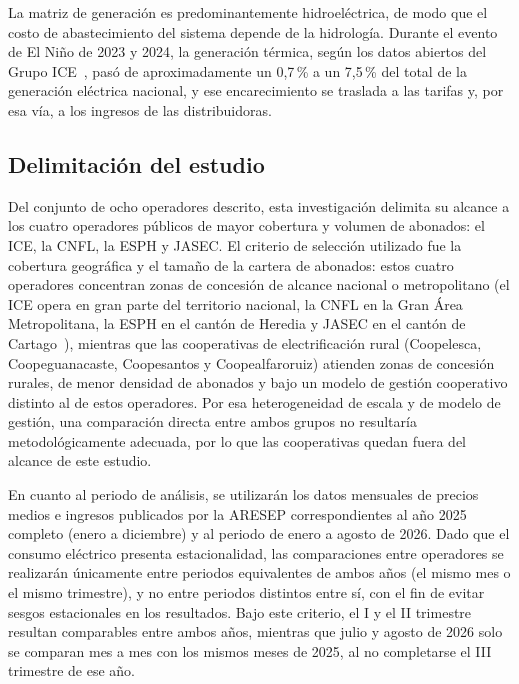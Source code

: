 \documentclass[conference]{IEEEtran}
\begin{document}
La matriz de generaci\'on es predominantemente hidroel\'ectrica, de modo que el costo de abastecimiento del sistema depende de la hidrolog\'ia. Durante el evento de El Ni\~no de 2023 y 2024, la generaci\'on t\'ermica, seg\'un los datos abiertos del Grupo ICE~\cite{r2}, pas\'o de aproximadamente un 0,7\,\% a un 7,5\,\% del total de la generaci\'on el\'ectrica nacional, y ese encarecimiento se traslada a las tarifas y, por esa v\'ia, a los ingresos de las distribuidoras.

\subsection{Delimitaci\'on del estudio}
\label{sec:delimitacion}

Del conjunto de ocho operadores descrito, esta investigaci\'on delimita su alcance a los cuatro operadores p\'ublicos de mayor cobertura y volumen de abonados: el ICE, la CNFL, la ESPH y JASEC. El criterio de selecci\'on utilizado fue la cobertura geogr\'afica y el tama\~no de la cartera de abonados: estos cuatro operadores concentran zonas de concesi\'on de alcance nacional o metropolitano (el ICE opera en gran parte del territorio nacional, la CNFL en la Gran \'Area Metropolitana, la ESPH en el cant\'on de Heredia y JASEC en el cant\'on de Cartago~\cite{r1}), mientras que las cooperativas de electrificaci\'on rural (Coopelesca, Coopeguanacaste, Coopesantos y Coopealfaroruiz) atienden zonas de concesi\'on rurales, de menor densidad de abonados y bajo un modelo de gesti\'on cooperativo distinto al de estos operadores. Por esa heterogeneidad de escala y de modelo de gesti\'on, una comparaci\'on directa entre ambos grupos no resultar\'ia metodol\'ogicamente adecuada, por lo que las cooperativas quedan fuera del alcance de este estudio.

En cuanto al periodo de an\'alisis, se utilizar\'an los datos mensuales de precios medios e ingresos publicados por la ARESEP correspondientes al a\~no 2025 completo (enero a diciembre) y al periodo de enero a agosto de 2026. Dado que el consumo el\'ectrico presenta estacionalidad, las comparaciones entre operadores se realizar\'an \'unicamente entre periodos equivalentes de ambos a\~nos (el mismo mes o el mismo trimestre), y no entre periodos distintos entre s\'i, con el fin de evitar sesgos estacionales en los resultados. Bajo este criterio, el I y el II trimestre resultan comparables entre ambos a\~nos, mientras que julio y agosto de 2026 solo se comparan mes a mes con los mismos meses de 2025, al no completarse el III trimestre de ese a\~no.
\end{document}
